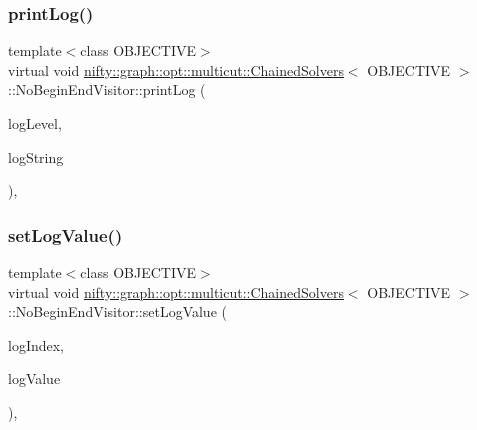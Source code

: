 \subsubsection{\texorpdfstring{print\+Log()}{printLog()}}
{\footnotesize\ttfamily template$<$class O\+B\+J\+E\+C\+T\+I\+VE$>$ \\
virtual void \hyperlink{classnifty_1_1graph_1_1opt_1_1multicut_1_1ChainedSolvers}{nifty\+::graph\+::opt\+::multicut\+::\+Chained\+Solvers}$<$ O\+B\+J\+E\+C\+T\+I\+VE $>$\+::No\+Begin\+End\+Visitor\+::print\+Log (\begin{DoxyParamCaption}\item[{const \hyperlink{namespacenifty_1_1logging_a3385625f9a0dbb17f70c47d3fca2f64d}{nifty\+::logging\+::\+Log\+Level}}]{log\+Level,  }\item[{const std\+::string \&}]{log\+String }\end{DoxyParamCaption})\hspace{0.3cm}{\ttfamily [inline]}, {\ttfamily [virtual]}}

\mbox{\label{classnifty_1_1graph_1_1opt_1_1multicut_1_1ChainedSolvers_1_1NoBeginEndVisitor_a5a9607531227e96e6299738d2da83ff1}} 
\subsubsection{\texorpdfstring{set\+Log\+Value()}{setLogValue()}}
{\footnotesize\ttfamily template$<$class O\+B\+J\+E\+C\+T\+I\+VE$>$ \\
virtual void \hyperlink{classnifty_1_1graph_1_1opt_1_1multicut_1_1ChainedSolvers}{nifty\+::graph\+::opt\+::multicut\+::\+Chained\+Solvers}$<$ O\+B\+J\+E\+C\+T\+I\+VE $>$\+::No\+Begin\+End\+Visitor\+::set\+Log\+Value (\begin{DoxyParamCaption}\item[{const size\+\_\+t}]{log\+Index,  }\item[{double}]{log\+Value }\end{DoxyParamCaption})\hspace{0.3cm}{\ttfamily [inline]}, {\ttfamily [virtual]}}

